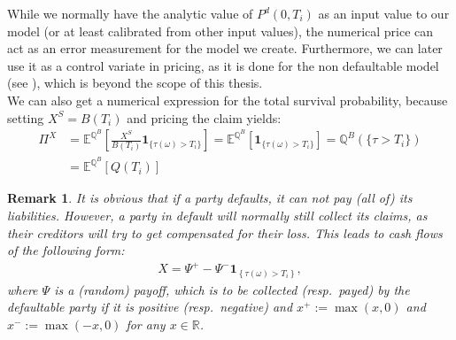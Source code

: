 \documentclass[12pt]{article}
\newtheorem{remark}[theorem]{Remark}
\begin{document}
	While we normally have the analytic value of $P^d(0, T_i)$ as an input value to our model (or at least calibrated from other input values), the numerical price can act as an error measurement for the model we create. Furthermore, we can later use it as a control variate in pricing, as it is done for the non defaultable model (see \cite{FriesBook}), which is beyond the scope of this thesis.\\
	We can also get a numerical expression for the total survival probability, because setting
	$X^S = B(T_i)$ and pricing the claim yields:
	\begin{align*}
		\Pi^X &= \mathbb{E}^{\mathbb{Q}^B}\left[ \frac{X^S}{B(T_i)} \mathbf{1}_{\{\tau(\omega) > T_i\}}\right] = \mathbb{E}^{\mathbb{Q}^B}\left[ \mathbf{1}_{\{\tau(\omega) > T_i\}}\right]
		= \mathbb{Q}^B(\{\tau > T_i\})\\
		&= \mathbb{E}^{\mathbb{Q}^B}\left[ Q(T_i)\right]
	\end{align*}
	\begin{remark}\label{rem:defaultablepartystillcollects}
		It is obvious that if a party defaults, it can not pay (all of) its liabilities. However, a party in default will normally still collect its claims, as their creditors will try to get compensated for their loss. This leads to cash flows of the following form:
		\begin{align*}
			X = \Psi^+ - \Psi^-\mathbf{1}_{\left\{\tau(\omega) > T_i\right\}},
		\end{align*}
		where $\Psi$ is a (random) payoff, which is to be collected (resp.\ payed) by the defaultable party if it is positive (resp.\ negative) and $x^+ := \max(x, 0)$ and $x^- := \max(-x, 0)$ for any $x\in \mathbb{R}$.
	\end{remark}
	
\end{document}
